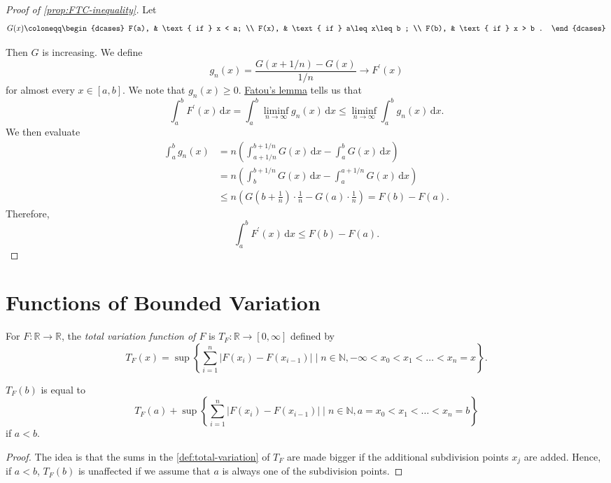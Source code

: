 \begin{proof}[Proof of \autoref{prop:FTC-inequality}]
	Let
	\[
		G(x)\coloneqq \begin{dcases}
			F(a), & \text{ if } x < a;          \\
			F(x), & \text{ if } a\leq x\leq b ; \\
			F(b), & \text{ if } x > b .
		\end{dcases}
	\]

	Then \(G\) is increasing. We define
	\[
		g_n(x) = \frac{G(x+1/n)- G(x)}{1/n} \to F^\prime (x)
	\]
	for almost every \(x \in [a,b]\). We note that \(g_n(x) \geq 0\). \hyperref[thm:Fatou-lemma]{Fatou's lemma} tells us that
	\[
		\int_a^b F^\prime (x) \,\mathrm{d} x = \int_a^b \liminf_{n \to \infty} g_n(x) \,\mathrm{d} x \leq \liminf_{n \to \infty} \int_a^b g_n(x) \,\mathrm{d} x.
	\]
	We then evaluate
	\[
		\begin{split}
			\int_a^b g_n(x) & = n\left( \int_{a+1/n}^{b+1/n} G(x) \,\mathrm{d} x - \int_a^b G(x) \,\mathrm{d} x \right)        \\
			                & = n\left( \int_b^{b+1/n} G(x) \,\mathrm{d} x - \int_a^{a+1/n} G(x) \,\mathrm{d} x \right)        \\
			                & \leq n\left( G\left( b + \frac{1}{n} \right) \cdot \frac{1}{n} - G(a) \cdot \frac{1}{n}  \right)
			= F(b) - F(a).
		\end{split}
	\]
	Therefore,
	\[
		\int_a^b F^\prime (x) \,\mathrm{d} x \leq F(b) - F(a).
	\]
\end{proof}

\section{Functions of Bounded Variation}
\begin{definition}\label{def:total-variation-function}
	For \(F \colon \mathbb{R} \to \mathbb{R}\), the \emph{total variation function of \(F\)} is \(T_F \colon \mathbb{R} \to [0,\infty]\) defined by
	\[
		T_F(x) = \sup \left\{\sum_{i=1}^n \left\vert F(x_i) - F(x_{i-1}) \right\vert \mid n \in \mathbb{N}, -\infty < x_0 < x_1 < \dots < x_n = x\right\}.
	\]
\end{definition}

\begin{lemma}\label{lma:lec34-1}
	\(T_F(b)\) is equal to
	\[
		T_F(a) + \sup \left\{\sum_{i=1}^n \left\vert F(x_i) - F(x_{i-1}) \right\vert \mid n \in \mathbb{N}, a = x_0 < x_1 < \dots < x_n = b\right\}
	\]
	if \(a < b\).
\end{lemma}
\begin{proof}
	The idea is that the sums in the \autoref{def:total-variation} of \(T_F\) are made bigger if the additional subdivision points \(x_{j} \) are added. Hence,
	if \(a <b\), \(T_F(b)\) is unaffected if we assume that \(a\) is always one of the subdivision points.
\end{proof}

